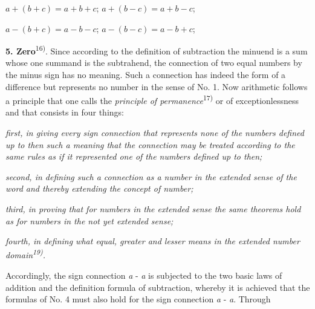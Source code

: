 \thispagestyle{fancy}

\vspace{0.5cm}

\begin{center}
$a + (b + c) = a + b + c$; \quad $a + (b - c) = a + b - c$; 

$a - (b + c) = a - b - c$; \quad $a - (b - c) = a - b + c$;
\end{center}

\textbf{5. Zero}\textsuperscript{16)}. Since according to the definition of subtraction the minuend is a sum whose one summand is the subtrahend, the connection of two equal numbers by the minus sign has no meaning. Such a connection has indeed the form of a difference but represents no number in the sense of No. 1. Now arithmetic follows a principle that one calls the \textit{principle of permanence}\textsuperscript{17)} or of exceptionlessness and that consists in four things:

\textit{first, in giving every sign connection that represents none of the numbers defined up to then such a meaning that the connection may be treated according to the same rules as if it represented one of the numbers defined up to then;}

\textit{second, in defining such a connection as a number in the extended sense of the word and thereby extending the concept of number;}

\textit{third, in proving that for numbers in the extended sense the same theorems hold as for numbers in the not yet extended sense;}

\textit{fourth, in defining what equal, greater and lesser means in the extended number domain\textsuperscript{19)}.}

Accordingly, the sign connection \textit{a} - \textit{a} is subjected to the two basic laws of addition and the definition formula of subtraction, whereby it is achieved that the formulas of No. 4 must also hold for the sign connection \textit{a} - \textit{a}. Through

